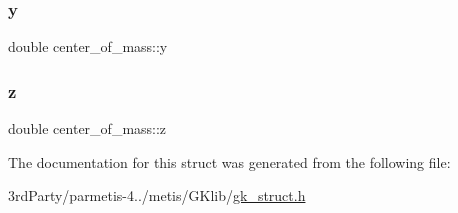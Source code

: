 \mbox{\label{structcenter__of__mass_a3e8fe055fd621185274f30f256830d90}} 
\subsubsection{\texorpdfstring{y}{y}}
{\footnotesize\ttfamily double center\+\_\+of\+\_\+mass\+::y}

\mbox{\label{structcenter__of__mass_a7dc0bfbcd0169218cefa37050731df2e}} 
\subsubsection{\texorpdfstring{z}{z}}
{\footnotesize\ttfamily double center\+\_\+of\+\_\+mass\+::z}



The documentation for this struct was generated from the following file\+:\begin{DoxyCompactItemize}
\item 
3rd\+Party/parmetis-\/4../metis/\+G\+Klib/\hyperlink{gk__struct_8h}{gk\+\_\+struct.\+h}\end{DoxyCompactItemize}

